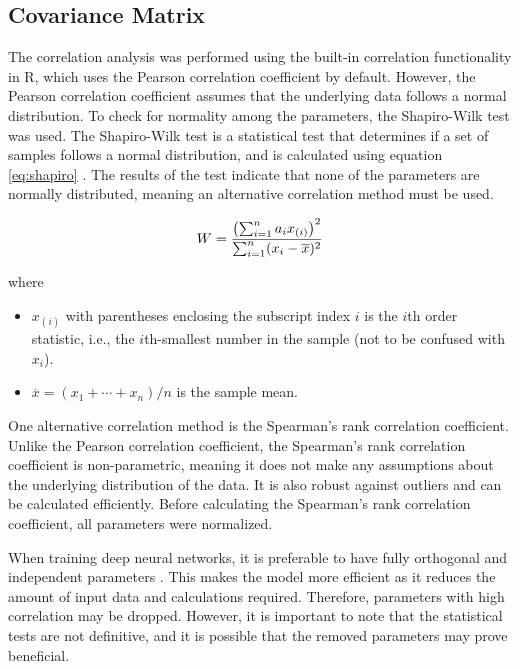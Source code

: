 \subsection{Covariance Matrix}

The correlation analysis was performed using the built-in correlation functionality in R, which uses the Pearson correlation coefficient by default. However, the Pearson correlation coefficient assumes that the underlying data follows a normal distribution. To check for normality among the parameters, the Shapiro-Wilk test was used. The Shapiro-Wilk test is a statistical test that determines if a set of samples follows a normal distribution, and is calculated using equation \ref{eq:shapiro} \cite{shapiro-test}. The results of the test indicate that none of the parameters are normally distributed, meaning an alternative correlation method must be used.

\begin{equation}
	W = {\left(\sum_{i=1}^n a_i x_{(i)}\right)^2 \over \sum_{i=1}^n (x_i-\overline{x})^2}
	\label{eq:shapiro}
\end{equation}

where

\begin{itemize}
	\item $x_{(i)}$ with parentheses enclosing the subscript index $i$ is the $i$th order statistic, i.e., the $i$th-smallest number in the sample (not to be confused with $x_i$).
	\item $\overline{x} = \left( x_1 + \cdots + x_n \right) / n$ is the sample mean.
\end{itemize}

One alternative correlation method is the Spearman's rank correlation coefficient. Unlike the Pearson correlation coefficient, the Spearman's rank correlation coefficient is non-parametric, meaning it does not make any assumptions about the underlying distribution of the data. It is also robust against outliers and can be calculated efficiently. Before calculating the Spearman's rank correlation coefficient, all parameters were normalized.

When training deep neural networks, it is preferable to have fully orthogonal and independent parameters \cite{pca-performance}. This makes the model more efficient as it reduces the amount of input data and calculations required. Therefore, parameters with high correlation may be dropped. However, it is important to note that the statistical tests are not definitive, and it is possible that the removed parameters may prove beneficial.


